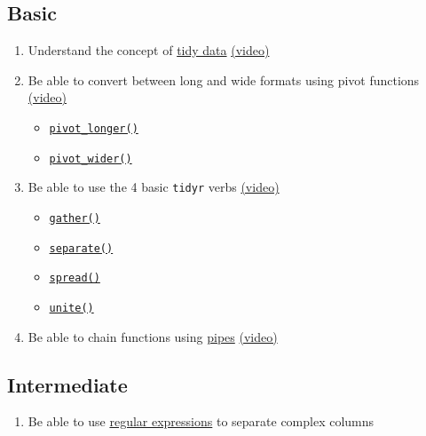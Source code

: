\documentclass[
  oneside]{book}
\providecommand{\tightlist}{%
  \setlength{\itemsep}{0pt}\setlength{\parskip}{0pt}}
\begin{document}
\hypertarget{basic-2}{%
\subsection*{Basic}\label{basic-2}}

\begin{enumerate}
\def\labelenumi{\arabic{enumi}.}
\tightlist
\item
  Understand the concept of \protect\hyperlink{tidy-data}{tidy data} \href{https://youtu.be/EsSN4OdsNpc}{(video)}
\item
  Be able to convert between long and wide formats using pivot functions \href{https://youtu.be/4dvLmjhwN8I}{(video)}

  \begin{itemize}
  \tightlist
  \item
    \protect\hyperlink{pivot_longer}{\texttt{pivot\_longer()}}
  \item
    \protect\hyperlink{pivot_wider}{\texttt{pivot\_wider()}}
  \end{itemize}
\item
  Be able to use the 4 basic \texttt{tidyr} verbs \href{https://youtu.be/oUWjb0JC8zM}{(video)}

  \begin{itemize}
  \tightlist
  \item
    \protect\hyperlink{gather}{\texttt{gather()}}
  \item
    \protect\hyperlink{separate}{\texttt{separate()}}
  \item
    \protect\hyperlink{spread}{\texttt{spread()}}
  \item
    \protect\hyperlink{unite}{\texttt{unite()}}
  \end{itemize}
\item
  Be able to chain functions using \protect\hyperlink{pipes}{pipes} \href{https://youtu.be/itfrlLaN4SE}{(video)}
\end{enumerate}

\hypertarget{intermediate-2}{%
\subsection*{Intermediate}\label{intermediate-2}}

\begin{enumerate}
\def\labelenumi{\arabic{enumi}.}
\setcounter{enumi}{4}
\tightlist
\item
  Be able to use \protect\hyperlink{regex}{regular expressions} to separate complex columns
\end{enumerate}
\end{document}
